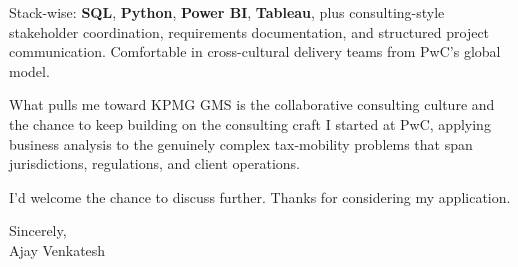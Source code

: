\documentclass[letterpaper,11pt]{article}
\begin{document}
Stack-wise: \textbf{SQL}, \textbf{Python}, \textbf{Power BI}, \textbf{Tableau}, plus consulting-style stakeholder coordination, requirements documentation, and structured project communication. Comfortable in cross-cultural delivery teams from PwC's global model.

What pulls me toward KPMG GMS is the collaborative consulting culture and the chance to keep building on the consulting craft I started at PwC, applying business analysis to the genuinely complex tax-mobility problems that span jurisdictions, regulations, and client operations.

I'd welcome the chance to discuss further. Thanks for considering my application.

\vspace{12pt}
Sincerely, \\
Ajay Venkatesh
\end{document}

